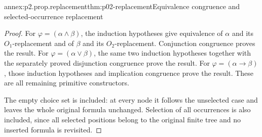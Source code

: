 \begin{annexitem}{annex:p2.prop.replacement}{thm:p02-replacement}{Equivalence congruence and selected-occurrence replacement}
\begin{proof}
For \(\varphi=(\alpha\land\beta)\), the induction hypotheses give equivalence
of \(\alpha\) and its \(O_1\)-replacement and of \(\beta\) and its
\(O_2\)-replacement.  Conjunction congruence proves the result.
For \(\varphi=(\alpha\lor\beta)\), the same two induction hypotheses together
with the separately proved disjunction congruence prove the result.
For \(\varphi=(\alpha\to\beta)\), those induction hypotheses and implication
congruence prove the result.  These are all remaining primitive constructors.

The empty choice set is included: at every node it follows the unselected
case and leaves the whole original formula unchanged.  Selection of all
occurrences is also included, since all selected positions belong to the
original finite tree and no inserted formula is revisited.
\end{proof}
\end{annexitem}

